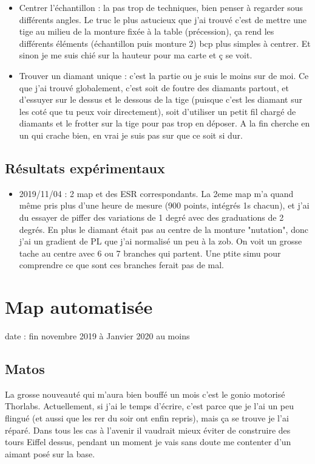\documentclass[a4paper]{report}
\begin{document}
\begin{itemize}
  \item Centrer l'échantillon : la pas trop de techniques, bien penser à regarder sous différents angles. Le truc le plus astucieux que j'ai trouvé c'est de mettre une tige au milieu de la monture fixée à la table (précession), ça rend les différents éléments (échantillon puis monture 2) bcp plus simples à centrer. Et sinon je me suis chié sur la hauteur pour ma carte et ç se voit.
  
  \item Trouver un diamant unique : c'est la partie ou je suis le moins sur de moi. Ce que j'ai trouvé globalement, c'est soit de foutre des diamants partout, et d'essuyer sur le dessus et le dessous de la tige (puisque c'est les diamant sur les coté que tu peux voir directement), soit d'utiliser un petit fil chargé de diamants et le frotter sur la tige pour pas trop en déposer. A la fin cherche en un qui crache bien, en vrai je suis pas sur que ce soit si dur.
  \end{itemize}
  
  \subsection{Résultats expérimentaux}
  \begin{itemize}
  \item 2019/11/04 : 2 map et des ESR correspondants. La 2eme map m'a quand même pris plus d'une heure de mesure (900 points, intégrés 1s chacun), et j'ai du essayer de piffer des variations de 1 degré avec des graduations de 2 degrés. En plus le diamant était pas au centre de la monture "nutation", donc j'ai un gradient de PL que j'ai normalisé un peu à la zob. On voit un grosse tache au centre avec 6 ou 7 branches qui partent. Une ptite simu pour comprendre ce que sont ces branches ferait pas de mal.
  \end{itemize}
  
  \section{Map automatisée}
  date : fin novembre 2019 à Janvier 2020 au moins
  \subsection{Matos}
  La grosse nouveauté qui m'aura bien bouffé un mois c'est le gonio motorisé Thorlabs. Actuellement, si j'ai le temps d'écrire, c'est parce que je l'ai un peu flingué (et aussi que les rer du soir ont enfin repris), mais ça se trouve je l'ai réparé. Dans tous les cas à l'avenir il vaudrait mieux éviter de construire des tours Eiffel dessus, pendant un moment je vais sans doute me contenter d'un aimant posé sur la base.
  
\end{document}
